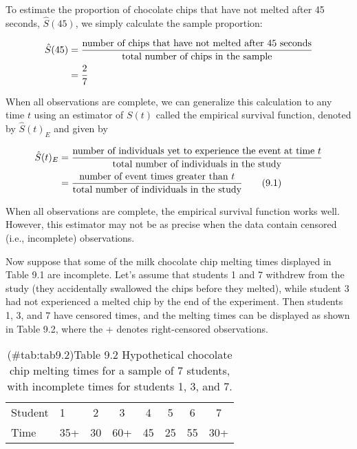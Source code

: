 \documentclass[
]{report}
\begin{document}
To estimate the proportion of chocolate chips that have not melted after 45 seconds, \(\hat S(45)\), we simply
calculate the sample proportion:

\begin{align}
\hat S(45) &= \frac{\text{number of chips that have not melted after 45 seconds}}{\text{total number of chips in the sample}} \notag \\
&= \frac{2}{7} \notag
\end{align}

When all observations are complete, we can generalize this calculation to any time \(t\) using an estimator of \(S(t)\) called the empirical survival function, denoted by \(\hat S(t)_{E}\) and given by

\begin{align}
\hat S(t)_{E}
&= \frac{\text{number of individuals yet to experience the event at time }t}{\text{total number of individuals in the study}} \notag \\
&= \frac{\text{number of event times greater than }t}{\text{total number of individuals in the study}}
\tag{9.1}
\end{align}

When all observations are complete, the empirical survival function works well. However, this estimator may not be as precise when the data contain censored (i.e., incomplete) observations.

Now suppose that some of the milk chocolate chip melting times displayed in Table 9.1 are incomplete. Let's assume that students 1 and 7 withdrew from the study (they accidentally swallowed the chips before they melted), while student 3 had not experienced a melted chip by the end of the experiment. Then students 1, 3, and 7 have censored times, and the melting times can be displayed as shown in Table 9.2, where the + denotes right-censored observations.

\begin{table}[!h]
\centering
\caption{(\#tab:tab9.2)Table 9.2 Hypothetical chocolate chip melting times for a sample of 7 students, with incomplete times for students 1, 3, and 7.}
\centering
\begin{tabular}[t]{llcccccc}
\toprule
  &  &  &  &  &  &  & \\
\midrule
Student & 1 & 2 & 3 & 4 & 5 & 6 & 7\\
Time & 35+ & 30 & 60+ & 45 & 25 & 55 & 30+\\
\bottomrule
\end{tabular}
\end{table}
\end{document}
